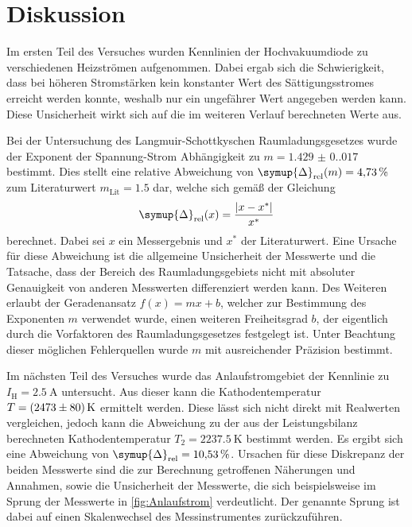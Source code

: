 \section{Diskussion}
\label{sec:Diskussion}
Im ersten Teil des Versuches wurden Kennlinien der Hochvakuumdiode zu verschiedenen Heizströmen aufgenommen. Dabei ergab sich die Schwierigkeit, dass bei höheren
Stromstärken kein konstanter Wert des Sättigungsstromes erreicht werden konnte, weshalb nur ein ungefährer Wert angegeben werden kann. Diese Unsicherheit wirkt 
sich auf die im weiteren Verlauf berechneten Werte aus. 

Bei der Untersuchung des Langmuir-Schottkyschen Raumladungsgesetzes wurde der Exponent der Spannung-Strom Abhängigkeit zu $m = \num{1.429(0.017)}$ bestimmt.
Dies stellt eine relative Abweichung von $\symup{\Delta}_\text{rel}(m) = \qty{4.73}{\percent}$ zum Literaturwert $m_\text{Lit} = 1.5$ dar, welche sich gemäß
der Gleichung
\begin{equation*}
    \symup{\Delta}_\text{rel}(x) = \frac{|x - x^*|}{x^*}
\end{equation*}
berechnet. Dabei sei $x$ ein Messergebnis und $x^*$ der Literaturwert. Eine Ursache für diese Abweichung ist die allgemeine Unsicherheit der Messwerte und die
Tatsache, dass der Bereich des Raumladungsgebiets nicht mit absoluter Genauigkeit von anderen Messwerten differenziert werden kann. Des Weiteren erlaubt der 
Geradenansatz $f(x) = mx + b$, welcher zur Bestimmung des Exponenten $m$ verwendet wurde, einen weiteren Freiheitsgrad $b$, der eigentlich durch die Vorfaktoren
des Raumladungsgesetzes festgelegt ist. Unter Beachtung dieser möglichen Fehlerquellen wurde $m$ mit ausreichender Präzision bestimmt.

Im nächsten Teil des Versuches wurde das Anlaufstromgebiet der Kennlinie zu $I_\text{H} = \qty{2.5}{\ampere}$ untersucht. Aus dieser kann die Kathodentemperatur
$T = \qty{2473+-80}{\kelvin}$ ermittelt werden. Diese lässt sich nicht direkt mit Realwerten vergleichen, jedoch kann die Abweichung zu der aus der Leistungsbilanz
berechneten Kathodentemperatur $T_2 = \qty{2237.5}{\kelvin}$ bestimmt werden. Es ergibt sich eine Abweichung von $\symup{\Delta}_\text{rel} = \qty{10.53}{\percent}$.
Ursachen für diese Diskrepanz der beiden Messwerte sind die zur Berechnung getroffenen Näherungen und Annahmen, sowie die Unsicherheit der Messwerte, die sich
beispielsweise im Sprung der Messwerte in \autoref{fig:Anlaufstrom} verdeutlicht. Der genannte Sprung ist dabei auf einen Skalenwechsel des Messinstrumentes 
zurückzuführen.

